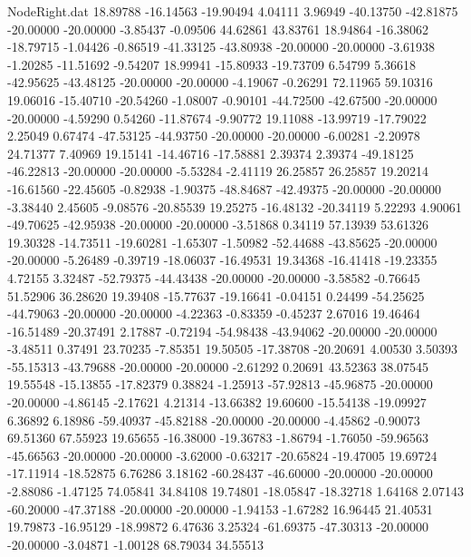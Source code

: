 \begin{filecontents}{NodeRight.dat}
  18.89788  -16.14563  -19.90494     4.04111    3.96949  -40.13750  -42.81875  -20.00000  -20.00000   -3.85437   -0.09506   44.62861   43.83761
  18.94864  -16.38062  -18.79715    -1.04426   -0.86519  -41.33125  -43.80938  -20.00000  -20.00000   -3.61938   -1.20285  -11.51692   -9.54207
  18.99941  -15.80933  -19.73709     6.54799    5.36618  -42.95625  -43.48125  -20.00000  -20.00000   -4.19067   -0.26291   72.11965   59.10316
  19.06016  -15.40710  -20.54260    -1.08007   -0.90101  -44.72500  -42.67500  -20.00000  -20.00000   -4.59290    0.54260  -11.87674   -9.90772
  19.11088  -13.99719  -17.79022     2.25049    0.67474  -47.53125  -44.93750  -20.00000  -20.00000   -6.00281   -2.20978   24.71377    7.40969
  19.15141  -14.46716  -17.58881     2.39374    2.39374  -49.18125  -46.22813  -20.00000  -20.00000   -5.53284   -2.41119   26.25857   26.25857
  19.20214  -16.61560  -22.45605    -0.82938   -1.90375  -48.84687  -42.49375  -20.00000  -20.00000   -3.38440    2.45605   -9.08576  -20.85539
  19.25275  -16.48132  -20.34119     5.22293    4.90061  -49.70625  -42.95938  -20.00000  -20.00000   -3.51868    0.34119   57.13939   53.61326
  19.30328  -14.73511  -19.60281    -1.65307   -1.50982  -52.44688  -43.85625  -20.00000  -20.00000   -5.26489   -0.39719  -18.06037  -16.49531
  19.34368  -16.41418  -19.23355     4.72155    3.32487  -52.79375  -44.43438  -20.00000  -20.00000   -3.58582   -0.76645   51.52906   36.28620
  19.39408  -15.77637  -19.16641    -0.04151    0.24499  -54.25625  -44.79063  -20.00000  -20.00000   -4.22363   -0.83359   -0.45237    2.67016
  19.46464  -16.51489  -20.37491     2.17887   -0.72194  -54.98438  -43.94062  -20.00000  -20.00000   -3.48511    0.37491   23.70235   -7.85351
  19.50505  -17.38708  -20.20691     4.00530    3.50393  -55.15313  -43.79688  -20.00000  -20.00000   -2.61292    0.20691   43.52363   38.07545
  19.55548  -15.13855  -17.82379     0.38824   -1.25913  -57.92813  -45.96875  -20.00000  -20.00000   -4.86145   -2.17621    4.21314  -13.66382
  19.60600  -15.54138  -19.09927     6.36892    6.18986  -59.40937  -45.82188  -20.00000  -20.00000   -4.45862   -0.90073   69.51360   67.55923
  19.65655  -16.38000  -19.36783    -1.86794   -1.76050  -59.96563  -45.66563  -20.00000  -20.00000   -3.62000   -0.63217  -20.65824  -19.47005
  19.69724  -17.11914  -18.52875     6.76286    3.18162  -60.28437  -46.60000  -20.00000  -20.00000   -2.88086   -1.47125   74.05841   34.84108
  19.74801  -18.05847  -18.32718     1.64168    2.07143  -60.20000  -47.37188  -20.00000  -20.00000   -1.94153   -1.67282   16.96445   21.40531
  19.79873  -16.95129  -18.99872     6.47636    3.25324  -61.69375  -47.30313  -20.00000  -20.00000   -3.04871   -1.00128   68.79034   34.55513

\end{filecontents}
